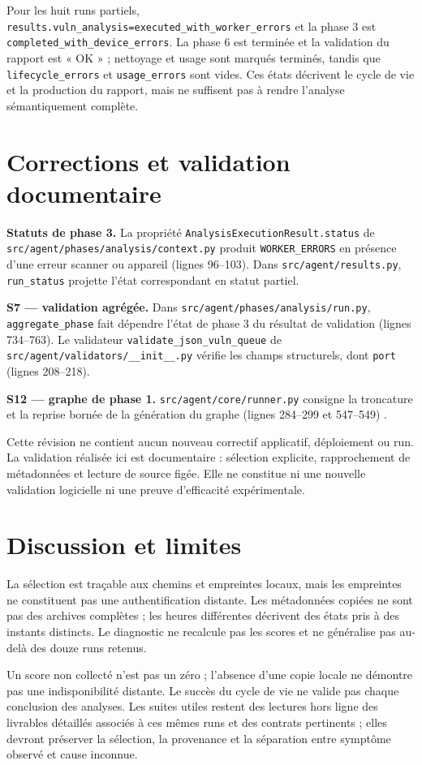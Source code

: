 \documentclass[11pt,a4paper]{article}
\newcommand{\code}[1]{{\urlstyle{tt}\nolinkurl{#1}}}
\begin{document}
Pour les huit runs partiels, \code{results.vuln_analysis=executed_with_worker_errors} et la phase 3 est \code{completed_with_device_errors}. La phase 6 est terminée et la validation du rapport est « OK » ; nettoyage et usage sont marqués terminés, tandis que \code{lifecycle_errors} et \code{usage_errors} sont vides. Ces états décrivent le cycle de vie et la production du rapport, mais ne suffisent pas à rendre l'analyse sémantiquement complète.
\section{Corrections et validation documentaire}
\textbf{Statuts de phase 3.} La propriété \code{AnalysisExecutionResult.status} de \code{src/agent/phases/analysis/context.py} produit \code{WORKER_ERRORS} en présence d'une erreur scanner ou appareil (lignes 96–103). Dans \code{src/agent/results.py}, \code{run_status} projette l'état correspondant en statut partiel.

\textbf{S7 — validation agrégée.} Dans \code{src/agent/phases/analysis/run.py}, \code{aggregate_phase} fait dépendre l'état de phase 3 du résultat de validation (lignes 734–763). Le validateur \code{validate_json_vuln_queue} de \code{src/agent/validators/__init__.py} vérifie les champs structurels, dont \code{port} (lignes 208–218).

\textbf{S12 — graphe de phase 1.} \code{src/agent/core/runner.py} consigne la troncature et la reprise bornée de la génération du graphe (lignes 284–299 et 547–549) \cite{sources}.

Cette révision ne contient aucun nouveau correctif applicatif, déploiement ou run. La validation réalisée ici est documentaire : sélection explicite, rapprochement de métadonnées et lecture de source figée. Elle ne constitue ni une nouvelle validation logicielle ni une preuve d'efficacité expérimentale.
\section{Discussion et limites}
La sélection est traçable aux chemins et empreintes locaux, mais les empreintes ne constituent pas une authentification distante. Les métadonnées copiées ne sont pas des archives complètes ; les heures différentes décrivent des états pris à des instants distincts. Le diagnostic ne recalcule pas les scores et ne généralise pas au-delà des douze runs retenus.

Un score non collecté n'est pas un zéro ; l'absence d'une copie locale ne démontre pas une indisponibilité distante. Le succès du cycle de vie ne valide pas chaque conclusion des analyses. Les suites utiles restent des lectures hors ligne des livrables détaillés associés à ces mêmes runs et des contrats pertinents ; elles devront préserver la sélection, la provenance et la séparation entre symptôme observé et cause inconnue.
\end{document}
